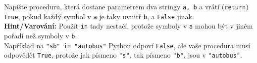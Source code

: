 \question[70]
Napište proceduru, která dostane parametrem dva stringy \texttt{a, b} a vrátí
(\texttt{return})
\texttt{True}, pokud každý symbol v \texttt{a} je taky uvnitř
\texttt{b}, a
\texttt{False} jinak.\\
\textbf{Hint/Varování:} Použít \texttt{in} tady nestačí, protože symboly v
\texttt{a} mohou být v jiném pořadí než symboly v \texttt{b}.\\
Například na \texttt{"sb"~in "autobus"} Python odpoví \texttt{False}, ale vaše
procedura musí odpovědět \texttt{True}, protože jak písmeno \texttt{"s"}, tak
písmeno \texttt{"b"}, jsou v \texttt{"autobus"}.